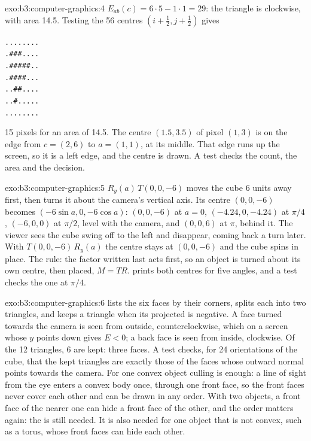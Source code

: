 \begin{solution}{exo:b3:computer-graphics:4}
$E_{ab}(c) = 6 \cdot 5 - 1 \cdot 1 = 29$: the triangle is clockwise, with area 14.5. Testing the 56 centres $(i + \frac12, j + \frac12)$ gives
\begin{center}
\texttt{.{}.{}.{}.{}.{}.{}.{}.{}}\\ \texttt{.{}\#\#\#.{}.{}.{}.{}}\\ \texttt{.{}\#\#\#\#\#.{}.{}}\\ \texttt{.{}\#\#\#\#.{}.{}.{}}\\ \texttt{.{}.{}\#\#.{}.{}.{}.{}}\\ \texttt{.{}.{}\#.{}.{}.{}.{}.{}}\\ \texttt{.{}.{}.{}.{}.{}.{}.{}.{}}
\end{center}
15 pixels for an area of 14.5. The centre $(1.5, 3.5)$ of pixel $(1, 3)$ is on the edge from $c = (2, 6)$ to $a = (1, 1)$, at its middle. That edge runs up the screen, so it is a left edge, and the centre is drawn. A test checks the count, the area and the decision.
\end{solution}

\begin{solution}{exo:b3:computer-graphics:5}
$R_y(a)\,T(0, 0, -6)$ moves the cube 6 units away first, then turns it about the camera's vertical axis. Its centre $(0, 0, -6)$ becomes $(-6\sin a, 0, -6\cos a)$: $(0, 0, -6)$ at $a = 0$, $(-4.24, 0, -4.24)$ at $\pi/4$, $(-6, 0, 0)$ at $\pi/2$, level with the camera, and $(0, 0, 6)$ at $\pi$, behind it. The viewer sees the cube swing off to the left and disappear, coming back a turn later. With $T(0, 0, -6)\,R_y(a)$ the centre stays at $(0, 0, -6)$ and the cube spins in place. The rule: the factor written last acts first, so an object is turned about its own centre, then placed, $M = T R$.  prints both centres for five angles, and a test checks the one at $\pi/4$.
\end{solution}

\begin{solution}{exo:b3:computer-graphics:6}
 lists the six faces by their corners, splits each into two triangles, and keeps a triangle when its projected  is negative. A face turned towards the camera is seen from outside, counterclockwise, which on a screen whose $y$ points down gives $E < 0$; a back face is seen from inside, clockwise. Of the 12 triangles, 6 are kept: three faces. A test checks, for 24 orientations of the cube, that the kept triangles are exactly those of the faces whose outward normal points towards the camera. For one convex object culling is enough: a line of sight from the eye enters a convex body once, through one front face, so the front faces never cover each other and can be drawn in any order. With two objects, a front face of the nearer one can hide a front face of the other, and the order matters again: the  is still needed. It is also needed for one object that is not convex, such as a torus, whose front faces can hide each other.
\end{solution}

